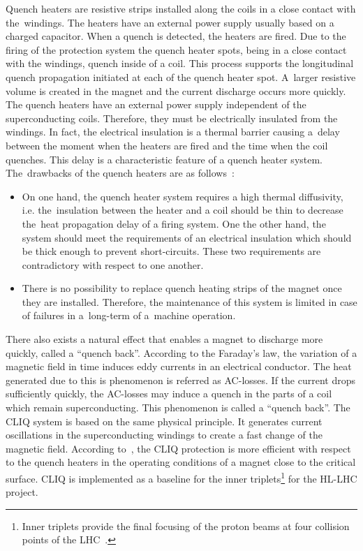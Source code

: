 Quench heaters are resistive strips installed along the coils in a close contact with the~windings. The heaters have an external power supply usually based on a charged capacitor. When a quench is detected, the heaters are fired. Due to the firing of the protection system the quench heater spots, being in a close contact with the windings, quench inside of a coil. This process supports the longitudinal quench propagation initiated at each of the quench heater spot. A~larger resistive volume is created in the magnet and the current discharge occurs more quickly. The quench heaters have an external power supply independent of the superconducting coils. Therefore, they must be electrically insulated from the windings. In fact, the electrical insulation is a thermal barrier causing a~delay between the moment when the heaters are fired and the time when the coil quenches. This delay is a characteristic feature of a quench heater system. The~drawbacks of the quench heaters are as follows~\cite{salmiquenchheateroptimization}: 

\begin{itemize}
    \item On one hand, the quench heater system requires a high thermal diffusivity, i.e. the~insulation between the heater and a coil should be thin to decrease the~heat propagation delay of a firing system. One the other hand, the system should meet the requirements of an electrical insulation which should be thick enough to prevent short-circuits. These two requirements are contradictory with respect to one another. 
	\item There is no possibility to replace quench heating strips of the magnet once they are installed. Therefore, the maintenance of this system is limited in case of failures in a~long-term of a~machine operation. 
\end{itemize}

There also exists a natural effect that enables a magnet to discharge more quickly, called a “quench back”. According to the Faraday’s law, the variation of a magnetic field in time induces eddy currents in an electrical conductor. The heat generated due to this is phenomenon is referred as AC-losses. If the current drops sufficiently quickly, the AC-losses may induce a quench in the parts of a coil which remain superconducting. This phenomenon is called a “quench back”. The CLIQ system is based on the same physical principle. It generates current oscillations in the superconducting windings to create a fast change of the magnetic field. According to~\cite{ravaioli_cliq_phd_thesis}, the CLIQ protection is more efficient with respect to the quench heaters in the operating conditions of a magnet close to the critical surface. CLIQ is implemented as a baseline for the inner triplets\footnote{Inner triplets provide the final focusing of the proton beams at four collision points of the LHC~\cite{lhc_inner_triplet_powering_strategy}.} for the HL-LHC project.

